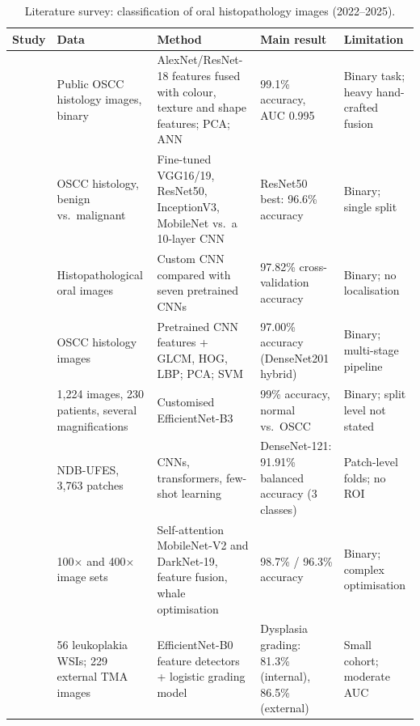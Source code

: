 \documentclass[10pt,twocolumn]{article}
\begin{document}
\begin{table}[t]
\centering
\caption{Literature survey: classification of oral histopathology images (2022--2025).}
\label{tab:litcls}
\footnotesize
\begin{tabularx}{\textwidth}{@{}p{2.6cm}p{3.1cm}YYp{3.0cm}@{}}
\toprule
Study & Data & Method & Main result & Limitation \\
\midrule
\citet{fati2022} & Public OSCC histology images, binary & AlexNet/ResNet-18 features fused with colour, texture and shape features; PCA; ANN & 99.1\% accuracy, AUC 0.995 & Binary task; heavy hand-crafted fusion \\
\citet{panigrahi2023} & OSCC histology, benign vs.\ malignant & Fine-tuned VGG16/19, ResNet50, InceptionV3, MobileNet vs.\ a 10-layer CNN & ResNet50 best: 96.6\% accuracy & Binary; single split \\
\citet{das2023} & Histopathological oral images & Custom CNN compared with seven pretrained CNNs & 97.82\% cross-validation accuracy & Binary; no localisation \\
\citet{ahmad2023} & OSCC histology images & Pretrained CNN features + GLCM, HOG, LBP; PCA; SVM & 97.00\% accuracy (DenseNet201 hybrid) & Binary; multi-stage pipeline \\
\citet{albalawi2024} & 1,224 images, 230 patients, several magnifications & Customised EfficientNet-B3 & 99\% accuracy, normal vs.\ OSCC & Binary; split level not stated \\
\citet{maia2024} & NDB-UFES, 3,763 patches & CNNs, transformers, few-shot learning & DenseNet-121: 91.91\% balanced accuracy (3 classes) & Patch-level folds; no ROI \\
\citet{meer2025} & 100$\times$ and 400$\times$ image sets & Self-attention MobileNet-V2 and DarkNet-19, feature fusion, whale optimisation & 98.7\% / 96.3\% accuracy & Binary; complex optimisation \\
\citet{peng2024} & 56 leukoplakia WSIs; 229 external TMA images & EfficientNet-B0 feature detectors + logistic grading model & Dysplasia grading: 81.3\% (internal), 86.5\% (external) & Small cohort; moderate AUC \\
\bottomrule
\end{tabularx}
\end{table}
\end{document}
